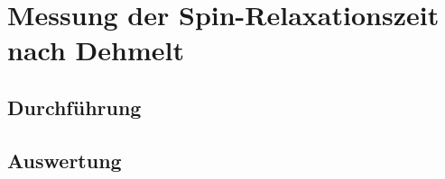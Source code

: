 \section{Messung der Spin-Relaxationszeit nach Dehmelt}
\subsection{Durchführung}
\subsection{Auswertung}